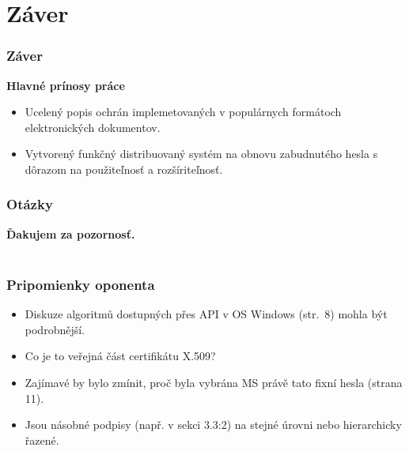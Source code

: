 \documentclass[xcolor=dvipsnames]{beamer}
\def\itemtitle#1{{\bfseries#1\smallskip}}
\begin{document}

\section{Záver}
\begin{frame}
	\frametitle{Záver}

	\itemtitle{Hlavné prínosy práce}
	\begin{itemize}
		\item Ucelený popis ochrán implemetovaných v populárnych formátoch elektronických dokumentov.
		\item Vytvorený funkčný distribuovaný systém na obnovu zabudnutého hesla s dôrazom na použiteľnosť a rozšíriteľnosť.
	\end{itemize}
		
\end{frame}



\begin{frame}
   \frametitle{Otázky}
 	\vspace*{\fill}

 	\begin{center} 		
 		\huge\bfseries{} Ďakujem za pozornosť.\\~\\
 	\end{center}
 	\vspace*{\fill}
 \end{frame}



\begin{frame}
	\frametitle{Pripomienky oponenta}
	\begin{itemize}
		\item Diskuze algoritmů dostupných přes API v OS Windows (str.~8) mohla být podrobnější.
		\item Co je to veřejná část certifikátu X.509?
		\item Zajímavé by bylo zmínit, proč byla vybrána MS právě tato fixní hesla (strana 11).
		\item Jsou násobné podpisy (např. v sekci 3.3:2) na stejné úrovni nebo hierarchicky řazené. 
	\end{itemize}

\end{frame}
\end{document}
